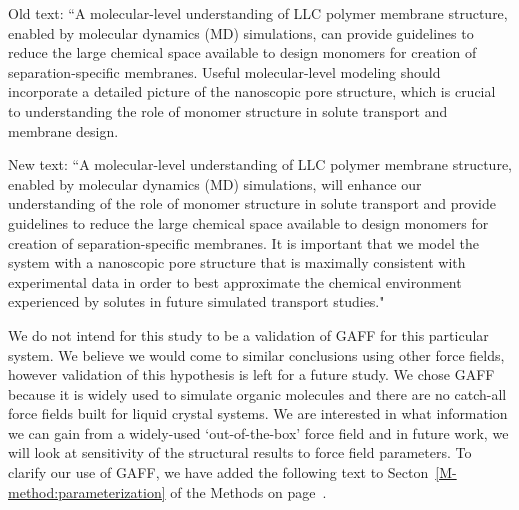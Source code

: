 \documentclass{article}
\begin{document}
\begin{enumerate}
    Old text: ``A molecular-level understanding of LLC polymer membrane
    structure, enabled by molecular dynamics (MD) simulations, can provide
    guidelines to reduce the large chemical space available to design monomers for
    creation of separation-specific membranes. Useful molecular-level modeling
    should incorporate a detailed picture of the nanoscopic pore structure, which
    is crucial to understanding the role of monomer structure in solute transport
    and membrane design. 

    New text: ``A molecular-level understanding of LLC polymer membrane
    structure, enabled by molecular dynamics (MD) simulations, will enhance our
    understanding of the role of monomer structure in solute transport and provide
    guidelines to reduce the large chemical space available to design monomers for
    creation of separation-specific membranes. It is important that we model the
    system with a nanoscopic pore structure that is maximally consistent with
    experimental data in order to best approximate the chemical environment experienced
    by solutes in future simulated transport studies."


    We do not intend for this study to be a validation of GAFF for this
    particular system. We believe we would come to similar conclusions using other
    force fields, however validation of this hypothesis is left for a future study.
    We chose GAFF because it is widely used to simulate organic molecules and there
    are no catch-all force fields built for liquid crystal systems. We are interested in
    what information we can gain from a widely-used `out-of-the-box' force field and in future
    work, 
    we will look at sensitivity of the structural results to force field parameters.
    To clarify our use of GAFF, we have added
    the following text to Secton~\ref{M-method:parameterization} of the Methods on
    page~\pageref{M-method:parameterization}.


\end{enumerate}
\end{document}
